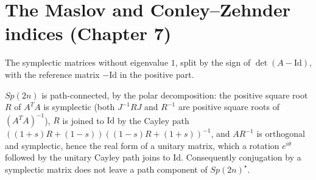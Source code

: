 \chapter{The Maslov and Conley--Zehnder indices (Chapter 7)}

\begin{definition}
  \label{def:7.1.c}
  \leanok
  The symplectic matrices without eigenvalue $1$, split by the sign of
  $\det(A-\mathrm{Id})$, with the reference matrix $-\mathrm{Id}$ in the positive
  part.
\end{definition}

\begin{proposition}
  \label{prop:5.6.9-connected}
  \leanok
  $Sp(2n)$ is path-connected, by the polar decomposition: the positive square
  root $R$ of $A^{T}A$ is symplectic (both $J^{-1}RJ$ and $R^{-1}$ are positive
  square roots of $(A^{T}A)^{-1}$), $R$ is joined to $\mathrm{Id}$ by the Cayley
  path $((1+s)R + (1-s))((1-s)R + (1+s))^{-1}$, and $AR^{-1}$ is orthogonal and
  symplectic, hence the real form of a unitary matrix, which a rotation
  $e^{i\theta}$ followed by the unitary Cayley path joins to $\mathrm{Id}$.
  Consequently conjugation by a symplectic matrix does not leave a path
  component of $Sp(2n)^\star$.
\end{proposition}

